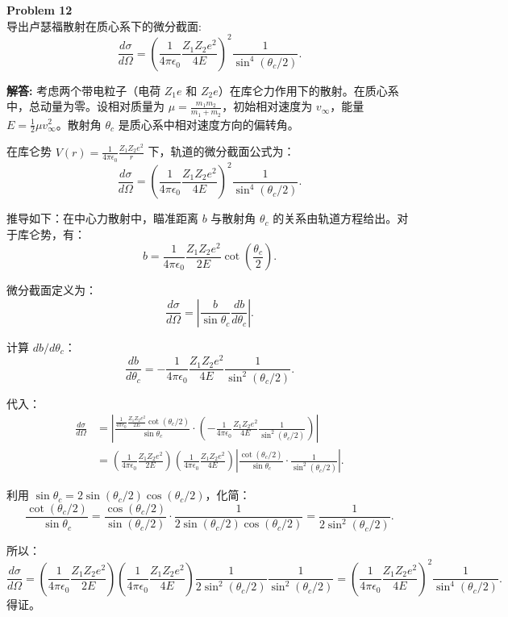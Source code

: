 \documentclass[12pt, a4paper, oneside]{ctexart}
\newenvironment{solution}{\par\noindent\textbf{解答:}\quad}{\par}
\begin{document}
\begin{mdframed}[backgroundcolor=gray!10, linewidth=0pt]
    \textbf{Problem 12} \\
    导出卢瑟福散射在质心系下的微分截面:
    \[
    \frac{d\sigma}{d\Omega} = \left( \frac{1}{4\pi\epsilon_0} \frac{Z_1 Z_2 e^2}{4 E} \right)^2 \frac{1}{\sin^4(\theta_c/2)}.
    \]
\end{mdframed}
\begin{solution}
    考虑两个带电粒子（电荷 \(Z_1 e\) 和 \(Z_2 e\)）在库仑力作用下的散射。在质心系中，总动量为零。设相对质量为 \(\mu = \frac{m_1 m_2}{m_1+m_2}\)，初始相对速度为 \(v_\infty\)，能量 \(E = \frac{1}{2} \mu v_\infty^2\)。散射角 \(\theta_c\) 是质心系中相对速度方向的偏转角。
    
    在库仑势 \(V(r) = \frac{1}{4\pi\epsilon_0} \frac{Z_1 Z_2 e^2}{r}\) 下，轨道的微分截面公式为：
    \[
    \frac{d\sigma}{d\Omega} = \left( \frac{1}{4\pi\epsilon_0} \frac{Z_1 Z_2 e^2}{4E} \right)^2 \frac{1}{\sin^4(\theta_c/2)}.
    \]
    
    推导如下：在中心力散射中，瞄准距离 \(b\) 与散射角 \(\theta_c\) 的关系由轨道方程给出。对于库仑势，有：
    \[
    b = \frac{1}{4\pi\epsilon_0} \frac{Z_1 Z_2 e^2}{2E} \cot\left(\frac{\theta_c}{2}\right).
    \]
    
    微分截面定义为：
    \[
    \frac{d\sigma}{d\Omega} = \left| \frac{b}{\sin\theta_c} \frac{db}{d\theta_c} \right|.
    \]
    
    计算 \(db/d\theta_c\)：
    \[
    \frac{db}{d\theta_c} = -\frac{1}{4\pi\epsilon_0} \frac{Z_1 Z_2 e^2}{4E} \frac{1}{\sin^2(\theta_c/2)}.
    \]
    
    代入：
    \begin{align*}
        \frac{d\sigma}{d\Omega} &= \left| \frac{ \frac{1}{4\pi\epsilon_0} \frac{Z_1 Z_2 e^2}{2E} \cot(\theta_c/2) }{ \sin\theta_c } \cdot \left( -\frac{1}{4\pi\epsilon_0} \frac{Z_1 Z_2 e^2}{4E} \frac{1}{\sin^2(\theta_c/2)} \right) \right| \\
        &= \left( \frac{1}{4\pi\epsilon_0} \frac{Z_1 Z_2 e^2}{2E} \right) \left( \frac{1}{4\pi\epsilon_0} \frac{Z_1 Z_2 e^2}{4E} \right) \left| \frac{\cot(\theta_c/2)}{\sin\theta_c} \cdot \frac{1}{\sin^2(\theta_c/2)} \right|.
    \end{align*}
    
    利用 \(\sin\theta_c = 2 \sin(\theta_c/2) \cos(\theta_c/2)\)，化简：
    \[
    \frac{\cot(\theta_c/2)}{\sin\theta_c} = \frac{\cos(\theta_c/2)}{\sin(\theta_c/2)} \cdot \frac{1}{2 \sin(\theta_c/2) \cos(\theta_c/2)} = \frac{1}{2 \sin^2(\theta_c/2)}.
    \]
    
    所以：
    \[
    \frac{d\sigma}{d\Omega} = \left( \frac{1}{4\pi\epsilon_0} \frac{Z_1 Z_2 e^2}{2E} \right) \left( \frac{1}{4\pi\epsilon_0} \frac{Z_1 Z_2 e^2}{4E} \right) \frac{1}{2 \sin^2(\theta_c/2)} \frac{1}{\sin^2(\theta_c/2)} = \left( \frac{1}{4\pi\epsilon_0} \frac{Z_1 Z_2 e^2}{4E} \right)^2 \frac{1}{\sin^4(\theta_c/2)}.
    \]
    得证。
\end{solution}
\end{document}
